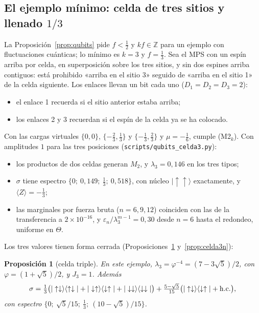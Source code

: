 \documentclass[11pt,a4paper]{article}
\newtheorem{proposicion}[teorema]{Proposición}
\theoremstyle{remark}
\newcommand{\ket}[1]{|#1\rangle}
\newcommand{\bra}[1]{\langle #1|}
\newcommand{\ev}[1]{\langle #1\rangle}
\begin{document}
\subsection*{El ejemplo mínimo: celda de tres sitios y llenado $1/3$}

La Proposición~\ref{prop:qubits} pide $f<\tfrac12$ y $kf\in\mathbb Z$ para un ejemplo con
fluctuaciones cuánticas; lo mínimo es $k=3$ y $f=\tfrac13$. Sea el MPS con un espín arriba por
celda, en superposición sobre los tres sitios, y sin dos espines arriba contiguos: está
prohibido «arriba en el sitio 3» seguido de «arriba en el sitio 1» de la celda siguiente. Los
enlaces llevan un bit cada uno ($D_1=D_2=D_3=2$):
\begin{itemize}
\item el enlace 1 recuerda si el sitio anterior estaba arriba;
\item los enlaces 2 y 3 recuerdan si el espín de la celda ya se ha colocado.
\end{itemize}
Con las cargas virtuales $\{0,0\}$, $\{-\tfrac23,\tfrac13\}$ y $\{-\tfrac13,\tfrac23\}$ y
$\mu=-\tfrac16$, cumple (M2$_k$). Con amplitudes $1$ para las tres posiciones
(\texttt{scripts/qubits\_celda3.py}):
\begin{itemize}
\item los productos de dos celdas generan $M_2$, y $\lambda_3=0{,}146$ en los tres tipos;
\item $\sigma$ tiene espectro $\{0;\ 0{,}149;\ \tfrac13;\ 0{,}518\}$, con núcleo
  $\ket{\uparrow\uparrow}$ exactamente, y $\ev Z=-\tfrac13$;
\item las marginales por fuerza bruta ($n=6,9,12$) coinciden con las de la transferencia a
  $2\times10^{-16}$, y $\varepsilon_n/\lambda_3^{m-1}=0{,}30$ desde $n=6$ hasta el redondeo, uniforme
  en $\Theta$.
\end{itemize}
Los tres valores tienen forma cerrada (Proposiciones~\ref{prop:celda3} y~\ref{prop:celda3n}):

\begin{proposicion}[celda triple]\label{prop:celda3}
En este ejemplo, $\lambda_3=\varphi^{-4}=(7-3\sqrt5)/2$, con $\varphi=(1+\sqrt5)/2$, y $J_3=1$. Además
\[
  \sigma=\tfrac13\big(\ket{\uparrow\downarrow}\bra{\uparrow\downarrow}+\ket{\downarrow\uparrow}\bra{\downarrow\uparrow}
  +\ket{\downarrow\downarrow}\bra{\downarrow\downarrow}\big)
  +\tfrac{5-\sqrt5}{15}\big(\ket{\uparrow\downarrow}\bra{\downarrow\uparrow}+{\rm h.c.}\big),
\]
con espectro $\{0;\ \sqrt5/15;\ \tfrac13;\ (10-\sqrt5)/15\}$.
\end{proposicion}
\end{document}
